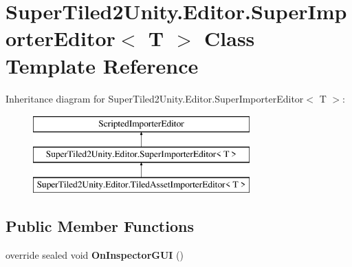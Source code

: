 \hypertarget{class_super_tiled2_unity_1_1_editor_1_1_super_importer_editor}{}\section{Super\+Tiled2\+Unity.\+Editor.\+Super\+Importer\+Editor$<$ T $>$ Class Template Reference}
\label{class_super_tiled2_unity_1_1_editor_1_1_super_importer_editor}
Inheritance diagram for Super\+Tiled2\+Unity.\+Editor.\+Super\+Importer\+Editor$<$ T $>$\+:\begin{figure}[H]
\begin{center}
\leavevmode
\includegraphics[height=3.000000cm]{class_super_tiled2_unity_1_1_editor_1_1_super_importer_editor}
\end{center}
\end{figure}
\subsection*{Public Member Functions}
\begin{DoxyCompactItemize}
\item 
\mbox{\label{class_super_tiled2_unity_1_1_editor_1_1_super_importer_editor_ac7fb462c1f1b866c249007e03aa79e6a}} 
override sealed void {\bfseries On\+Inspector\+G\+UI} ()
\end{DoxyCompactItemize}
